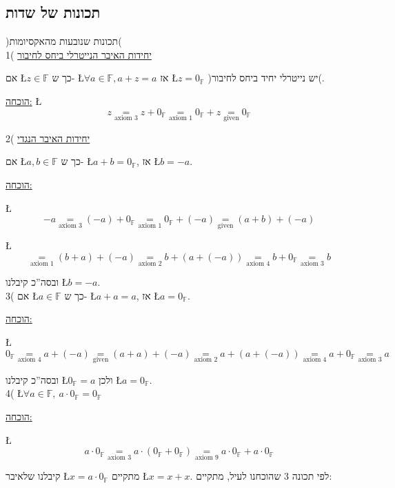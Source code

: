 \documentclass[english,hebrew]{article}
\begin{document}
\subsection{תכונות של שדות}

)תכונות שנובעות מהאקסיומות(\\

1( \underline{יחידות האיבר הנייטרלי ביחס לחיבור}

אם \L{$z\in\mathbb{F}$} כך ש- \L{$\forall a\in\mathbb{F},a+z=a$}
אז \L{$z=0_{\mathbb{F}}$} )יש נייטרלי יחיד ביחס לחיבור(.

\underline{הוכחה:} \L{%
\[
z\underset{\text{axiom 3}}{=}z+0_{\mathbb{F}}\underset{\text{axiom 1}}{=}0_{\mathbb{F}}+z\underset{\text{given}}{=}0_{\mathbb{F}}
\]
}%

2( \underline{יחידות האיבר הנגדי}

אם \L{$a,b\in\mathbb{F}$} כך ש- \L{$a+b=0_{\mathbb{F}}$}, אז \L{$b=-a$}.

\underline{הוכחה:}

\L{%
\[
-a\underset{\text{axiom 3}}{=}(-a)+0_{\mathbb{F}}\underset{\text{axiom 1}}{=}0_{\mathbb{F}}+(-a)\underset{\text{given}}{=}(a+b)+(-a)
\]
}%

\L{%
\[
\underset{\text{axiom 1}}{=}(b+a)+(-a)\underset{\text{axiom 2}}{=}b+(a+(-a))\underset{\text{axiom 4}}{=}b+0_{\mathbb{F}}\underset{\text{axiom 3}}{=}b
\]
}%

ובסה\textquotedblright כ קיבלנו \L{$b=-a$}.\\

3( אם \L{$a\in\mathbb{F}$} כך ש- \L{$a+a=a$}, אז \L{$a=0_{\mathbb{F}}$}.

\underline{הוכחה:}

\L{%
\[
0_{\mathbb{F}}\underset{\text{axiom 4}}{=}a+(-a)\underset{\text{given}}{=}(a+a)+(-a)\underset{\text{axiom 2}}{=}a+(a+(-a))\underset{\text{axiom 4}}{=}a+0_{\mathbb{F}}\underset{\text{axiom 3}}{=}a
\]
}%

ובסה\textquotedblright כ קיבלנו \L{$0_{\mathbb{F}}=a$} ולכן \L{$a=0_{\mathbb{F}}$}.\\

4( \L{$\forall a\in\mathbb{F},\ a\cdot0_{\mathbb{F}}=0_{\mathbb{F}}$}

\underline{הוכחה:}

\L{%
\[
a\cdot0_{\mathbb{F}}\underset{\text{axiom 3}}{=}a\cdot(0_{\mathbb{F}}+0_{\mathbb{F}})\underset{\text{axiom 9}}{=}a\cdot0_{\mathbb{F}}+a\cdot0_{\mathbb{F}}
\]
}%

קיבלנו שלאיבר \L{$x=a\cdot0_{\mathbb{F}}$} מתקיים \L{$x=x+x$}. לפי
תכונה 3 שהוכחנו לעיל, מתקיים:
\end{document}
